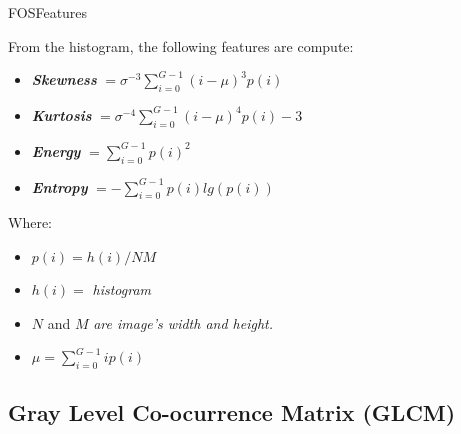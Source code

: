 \documentclass[10pt]{beamer}
\newcommand{\1}{
	\setbeamertemplate{background}{
		\texttt{[image: img/1\_dna]}
		\tikz[overlay] \fill[fill opacity=0.75,fill=white] (0,0) rectangle (-\paperwidth,\paperheight);
	}
}
\begin{document}
\begin{frame}{FOS}{Features}
	\begin{block}{}
		From the histogram, the following features are compute:
		\begin{itemize}
			\item \textbf{\textit{Skewness}} $ = \sigma^{-3} \sum_{i=0}^{G-1} (i - \mu)^3 p(i)$
			\item \textbf{\textit{Kurtosis}} $ = \sigma^{-4} \sum_{i=0}^{G-1} (i - \mu)^4 p(i)-3$
			\item \textbf{\textit{Energy}} $ = \sum_{i=0}^{G-1} p(i)^2$
			\item \textbf{\textit{Entropy}} $ = -\sum_{i=0}^{G-1} p(i)lg(p(i))$
		\end{itemize}
	\end{block}
	
	\begin{block}{}
		Where: 
		\begin{itemize}	
			\item	$p(i) = h(i)/NM$ 
			\item	$h(i) =$ \textit{histogram} 
			\item	$N$ and $M$ \textit{are image's width and height.} 
			\item	$\mu = \sum_{i=0}^{G-1}ip(i)$
		\end{itemize}
	\end{block}
\end{frame}

\subsection{Gray Level Co-ocurrence Matrix (GLCM)} \label{section:glcm}
\end{document}
